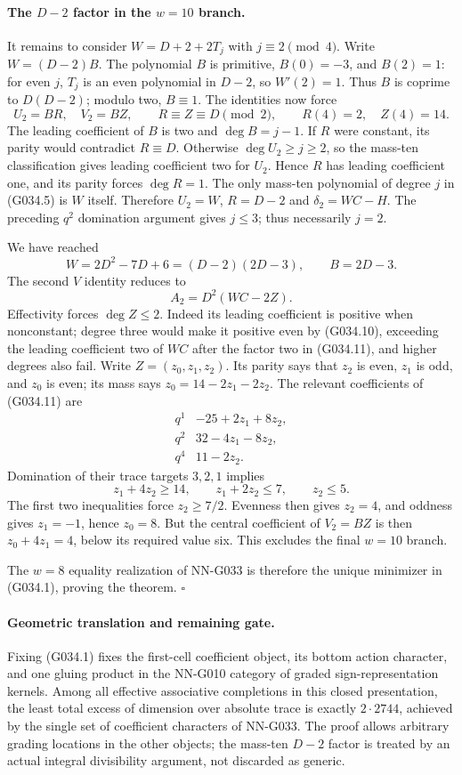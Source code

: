 \paragraph{The $D-2$ factor in the $w=10$ branch.}
It remains to consider $W=D+2+2T_j$ with
$j\equiv2\pmod4$. Write $W=(D-2)B$.
The polynomial $B$ is primitive, $B(0)=-3$, and
$B(2)=1$: for even $j$, $T_j$ is an even polynomial
in $D-2$, so $W'(2)=1$.
Thus $B$ is coprime to $D(D-2)$; modulo two,
$B\equiv1$. The identities now force
\[
 U_2=BR,\quad V_2=BZ,\qquad
 R\equiv Z\equiv D\pmod2,
 \qquad R(4)=2,\quad Z(4)=14.                       \tag{G034.10}
\]
The leading coefficient of $B$ is two and
$\deg B=j-1$. If $R$ were constant, its parity
would contradict $R\equiv D$.
Otherwise $\deg U_2\ge j\ge2$, so the mass-ten
classification gives leading coefficient two for $U_2$.
Hence $R$ has leading coefficient one, and its parity
forces $\deg R=1$. The only mass-ten polynomial of
degree $j$ in (G034.5) is $W$ itself. Therefore
$U_2=W$, $R=D-2$ and $\delta_2=WC-H$.
The preceding $q^2$ domination argument gives $j\le3$;
thus necessarily $j=2$.

We have reached
\[
 W=2D^2-7D+6=(D-2)(2D-3),\qquad B=2D-3.
\]
The second $V$ identity reduces to
\[
                    A_2=D^2(WC-2Z).                 \tag{G034.11}
\]
Effectivity forces $\deg Z\le2$. Indeed its leading
coefficient is positive when nonconstant; degree three
would make it positive even by (G034.10), exceeding
the leading coefficient two of $WC$ after the factor
two in (G034.11), and higher degrees also fail.
Write $Z=(z_0,z_1,z_2)$. Its parity says that $z_2$
is even, $z_1$ is odd, and $z_0$ is even; its mass says
$z_0=14-2z_1-2z_2$.
The relevant coefficients of (G034.11) are
\[
 \begin{array}{c|l}
 q^1&-25+2z_1+8z_2,\\
 q^2&32-4z_1-8z_2,\\
 q^4&11-2z_2.
 \end{array}
\]
Domination of their trace targets $3,2,1$ implies
\[
 z_1+4z_2\ge14,\qquad z_1+2z_2\le7,\qquad z_2\le5.
\]
The first two inequalities force $z_2\ge7/2$.
Evenness then gives $z_2=4$, and oddness gives
$z_1=-1$, hence $z_0=8$.
But the central coefficient of $V_2=BZ$ is then
$z_0+4z_1=4$, below its required value six.
This excludes the final $w=10$ branch.

The $w=8$ equality realization of NN-G033 is therefore
the unique minimizer in (G034.1), proving the theorem.
\hfill$\square$

\paragraph{Geometric translation and remaining gate.}
Fixing (G034.1) fixes the first-cell coefficient object,
its bottom action character, and one gluing product in
the NN-G010 category of graded sign-representation kernels.
Among all effective associative completions in this closed
presentation, the least total excess of dimension over
absolute trace is exactly $2\cdot2744$, achieved by the
single set of coefficient characters of NN-G033.
The proof allows arbitrary grading locations in the other
objects; the mass-ten $D-2$ factor is treated by an actual
integral divisibility argument, not discarded as generic.

